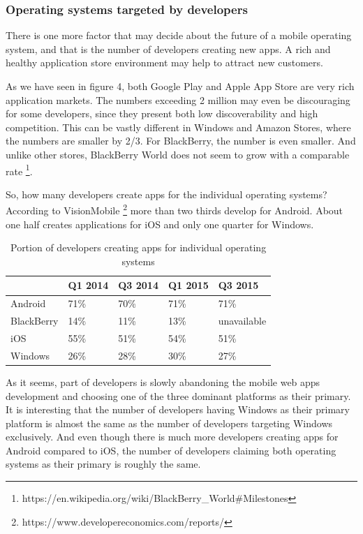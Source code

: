 \documentclass[english,master,public,dept460,male,cpdeclaration,oneside]{diploma}
\begin{document}
\subsubsection{Operating systems targeted by developers}
There is one more factor that may decide about the future of a mobile operating system, and that is the number of developers creating new apps. A rich and healthy application store environment may help to attract new customers. 

As we have seen in figure 4, both Google Play and Apple App Store are very rich application markets. The numbers exceeding 2 million may even be discouraging for some developers, since they present both low discoverability and high competition. This can be vastly different in Windows and Amazon Stores, where the numbers are smaller by 2/3. For BlackBerry, the number is even smaller. And unlike other stores, BlackBerry World does not seem to grow with a comparable rate \footnote{https://en.wikipedia.org/wiki/BlackBerry\_World\#Milestones}. 

So, how many developers create apps for the individual operating systems? According to VisionMobile \footnote{https://www.developereconomics.com/reports/} more than two thirds develop for Android. About one half creates applications for iOS and only one quarter for Windows.

\begin{table}
	\centering
	\caption{Portion of developers creating apps for individual operating systems}
	\begin{tabular}{l l l l l}
		\toprule
		 & Q1 2014 & Q3 2014 & Q1 2015 & Q3 2015 \\
		\midrule
		Android & 71\% & 70\% & 71\% & 71\% \\
		BlackBerry & 14\% & 11\% & 13\% & unavailable \\
		iOS & 55\% & 51\% & 54\% & 51\% \\
		Windows & 26\% & 28\% & 30\% & 27\% \\
		\midrule
	\end{tabular}
\end{table}

As it seems, part of developers is slowly abandoning the mobile web apps development and choosing one of the three dominant platforms as their primary. It is interesting that the number of developers having Windows as their primary platform is almost the same as the number of developers targeting Windows exclusively. And even though there is much more developers creating apps for Android compared to iOS, the number of developers claiming both operating systems as their primary is roughly the same.
\end{document}
